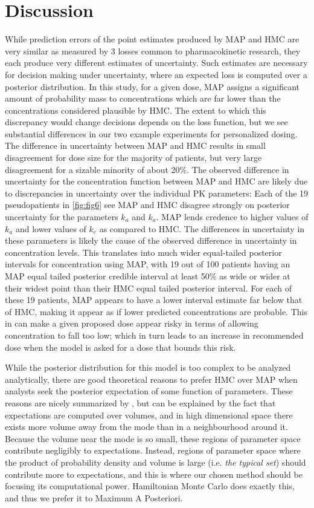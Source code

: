 \section{Discussion}

While prediction errors of the point estimates produced by MAP and HMC are very similar as measured by 3 losses common to pharmacokinetic research, they each produce very different estimates of uncertainty.  Such estimates are necessary for decision making under uncertainty, where an expected loss is computed over a posterior distribution.  In this study, for a given dose, MAP assigns a significant amount of probability mass to concentrations which are far lower than the concentrations considered plausible by HMC.  The extent to which this discrepancy would change decisions depends on the loss function, but we see substantial differences in our two example experiments for personalized dosing.  The difference in uncertainty between MAP and HMC results in small disagreement for dose size for the majority of patients, but very large disagreement for a sizable minority of about 20\%. The observed difference in uncertainty for the concentration function between MAP and HMC are likely due to discrepancies in uncertainty over the individual PK parameters: Each of the 19 pseudopatients in \cref{fig:fig6} see MAP and HMC disagree strongly on posterior uncertainty for the parameters $k_a$ and $k_a$.  MAP lends credence to higher values of $k_a$ and lower values of $k_e$ as compared to HMC. The differences in uncertainty in these parameters is likely the cause of the observed difference in uncertainty in concentration levels. This translates into much wider equal-tailed posterior intervals for concentration using MAP, with 19 out of 100 patients having an MAP equal tailed posterior credible interval at least 50\% as wide or wider at their widest point than their HMC equal tailed posterior interval. For each of these 19 patients, MAP appears to have a lower interval estimate far below that of HMC, making it appear as if lower predicted concentrations are probable. This in can make a given proposed dose appear risky in terms of allowing concentration to fall too low; which in turn leads to an increase in recommended dose when the model is asked for a dose that bounds this risk.

While the posterior distribution for this model is too complex to be analyzed analytically, there are good theoretical reasons to prefer HMC over MAP when analysts seek the posterior expectation of some function of parameters. These reasons are nicely summarized by \cite{Betancourt2017-ak}, but can be explained by the fact that expectations are computed over volumes, and in high dimensional space there exists more volume away from the mode than in a neighbourhood around it. Because the volume near the mode is so small, these regions of parameter space contribute negligibly to expectations.  Instead, regions of parameter space where the product of probability density and volume is large (i.e. \textit{the typical set}) should contribute more to expectations, and this is where our chosen method should be focusing its computational power.  Hamiltonian Monte Carlo does exactly this, and thus we prefer it to Maximum A Posteriori.


